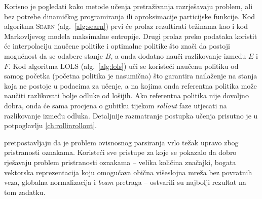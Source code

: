 Korisno je pogledati kako metode učenja pretraživanja razrješavaju problem, ali
bez potrebe dinamičkog programiranja ili aproksimacije particijske funkcije. Kod
algoritma \textsc{Searn} (alg.~\ref{alg:searn}) prvi će prolaz rezultirati
težinama kao i kod Markovljevog modela maksimalne entropije. Drugi prolaz preko
podataka koristit će interpolaciju naučene politike i optimalne politike što znači
da postoji mogućnost da se odabere stanje $B$, a onda dodatno nauči razlikovanje
između $E$ i $F$. Kod algoritma \textsc{LOLS} (alg.~\ref{alg:lols}) uči se
koristeći naučenu politiku od samog početka (početna politika je nasumična) što
garantira nailaženje na stanja koja ne postoje u podacima za učenje, a na kojima
onda referentna politika može naučiti razlikovati bolje odluke od lošijih. Ako
referentna politika nije dovoljno dobra, onda će sama procjena o gubitku tijekom
\textit{rollout} faze utjecati na razlikovanje između odluka. Detaljnije
razmatranje postupka učenja prisutno je u potpoglavlju \ref{ch:rollinrollout}.

\citet{andor2016globally} pretpostavljaju da je problem ovisnosnog parsiranja
vrlo težak upravo zbog pristranosti oznakama. Koristeći sve pristupe za koje se
pokazalo da dobro rješavaju problem pristranosti oznakama -- velika količina
značajki, bogata vektorska reprezentacija koju omogućava obična višeslojna mreža
bez povratnih veza, globalna normalizacija i \textit{beam} pretraga -- ostvarili
su najbolji rezultat na tom zadatku.
